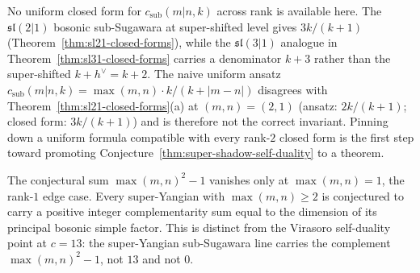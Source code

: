 \begin{remark}
\label{rem:super-shadow-sub-sugawara-formula-open}
No uniform closed form for $c_{\mathrm{sub}}(m|n, k)$ across rank is
available here. The $\mathfrak{sl}(2|1)$ bosonic sub-Sugawara at
super-shifted level gives $3k/(k + 1)$
(Theorem~\ref{thm:sl21-closed-forms}), while the
$\mathfrak{sl}(3|1)$ analogue in
Theorem~\ref{thm:sl31-closed-forms} carries a denominator $k + 3$
rather than the super-shifted $k + h^\vee = k + 2$. The naive
uniform ansatz
$c_{\mathrm{sub}}(m|n, k) = \max(m, n) \cdot k/(k + |m - n|)$
disagrees with Theorem~\ref{thm:sl21-closed-forms}(a) at
$(m, n) = (2, 1)$ (ansatz: $2k/(k + 1)$; closed form: $3k/(k + 1)$)
and is therefore not the correct invariant. Pinning down a uniform
formula compatible with every rank-$2$ closed form is the first
step toward promoting
Conjecture~\ref{thm:super-shadow-self-duality} to a theorem.
\end{remark}

\begin{remark}
\label{rem:super-shadow-sum-vanishes-when}
The conjectural sum $\max(m, n)^2 - 1$ vanishes only at
$\max(m, n) = 1$, the rank-$1$ edge case. Every super-Yangian with
$\max(m, n) \ge 2$ is conjectured to carry a positive integer
complementarity sum equal to the dimension of its principal bosonic
simple factor. This is distinct from the Virasoro self-duality
point at $c = 13$: the super-Yangian sub-Sugawara line carries the
complement $\max(m, n)^2 - 1$, not $13$ and not $0$.
\end{remark}

